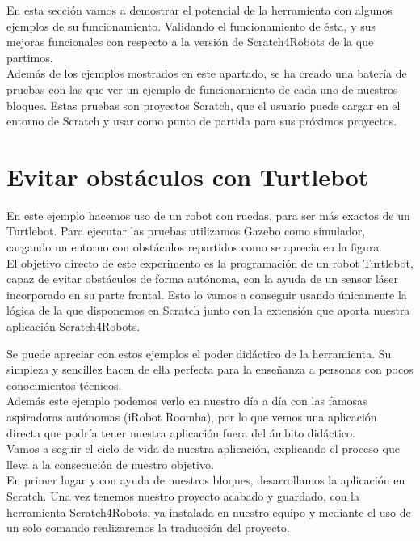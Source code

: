En esta sección vamos a demostrar el potencial de la herramienta con algunos ejemplos de su funcionamiento. Validando el funcionamiento de ésta, y sus mejoras funcionales con respecto a la versión de Scratch4Robots de la que partimos.\\

Además de los ejemplos mostrados en este apartado, se ha creado una batería de pruebas con las que ver un ejemplo de funcionamiento de cada uno de nuestros bloques. Estas pruebas son proyectos Scratch, que el usuario puede cargar en el entorno de Scratch y usar como punto de partida para sus próximos proyectos.

\section{Evitar obstáculos con Turtlebot}
\label{sec:evitar-obstaculos}

En este ejemplo hacemos uso de un robot con ruedas, para ser más exactos de un Turtlebot. Para ejecutar las pruebas utilizamos Gazebo como simulador, cargando un entorno con obstáculos repartidos como se aprecia en la figura.\\

El objetivo directo de este experimento es la programación de un robot Turtlebot, capaz de evitar obstáculos de forma autónoma, con la ayuda de un sensor láser incorporado en su parte frontal. Esto lo vamos a conseguir usando únicamente la lógica de la que disponemos en Scratch junto con la extensión que aporta nuestra aplicación Scratch4Robots.\\
\pagebreak

Se puede apreciar con estos ejemplos el poder didáctico de la herramienta. Su simpleza y sencillez hacen de ella perfecta para la enseñanza a personas con pocos conocimientos técnicos.\\

Además este ejemplo podemos verlo en nuestro día a día con las famosas aspiradoras autónomas (iRobot Roomba), por lo que vemos una aplicación directa que podría tener nuestra aplicación fuera del ámbito didáctico.\\

Vamos a seguir el ciclo de vida de nuestra aplicación, explicando el proceso que lleva a la consecución de nuestro objetivo.\\

En primer lugar y con ayuda de nuestros bloques, desarrollamos la aplicación en Scratch. Una vez tenemos nuestro proyecto acabado y guardado, con la herramienta Scratch4Robots, ya instalada en nuestro equipo y mediante el uso de un solo comando realizaremos la traducción del proyecto.\\

